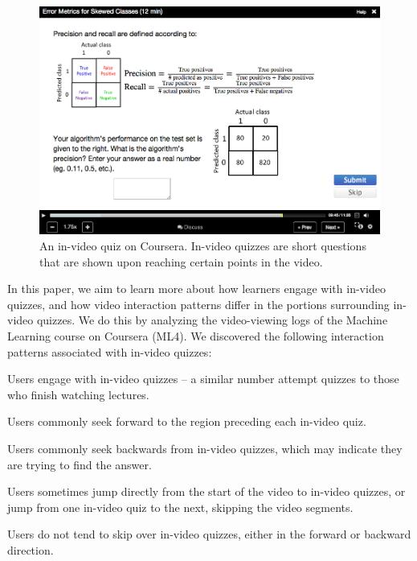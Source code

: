 \documentclass{sigchi}
\begin{document}
\begin{figure}
\includegraphics[width=1.0\columnwidth]{coursera}
\caption{An in-video quiz on Coursera. In-video quizzes are short questions that are shown upon reaching certain points in the video.}
\label{fig:coursera}
\end{figure}

In this paper, we aim to learn more about how learners engage with in-video quizzes, and how video interaction patterns differ in the portions surrounding in-video quizzes. We do this by analyzing the video-viewing logs of the Machine Learning course on Coursera (ML4). We discovered the following interaction patterns associated with in-video quizzes:


\begin{compactitem}
\item Users engage with in-video quizzes -- a similar number attempt quizzes to those who finish watching lectures.
\item Users commonly seek forward to the region preceding each in-video quiz.
\item Users commonly seek backwards from in-video quizzes, which may indicate they are trying to find the answer.
\item Users sometimes jump directly from the start of the video to in-video quizzes, or jump from one in-video quiz to the next, skipping the video segments.
\item Users do not tend to skip over in-video quizzes, either in the forward or backward direction. %
\end{compactitem}
\end{document}
